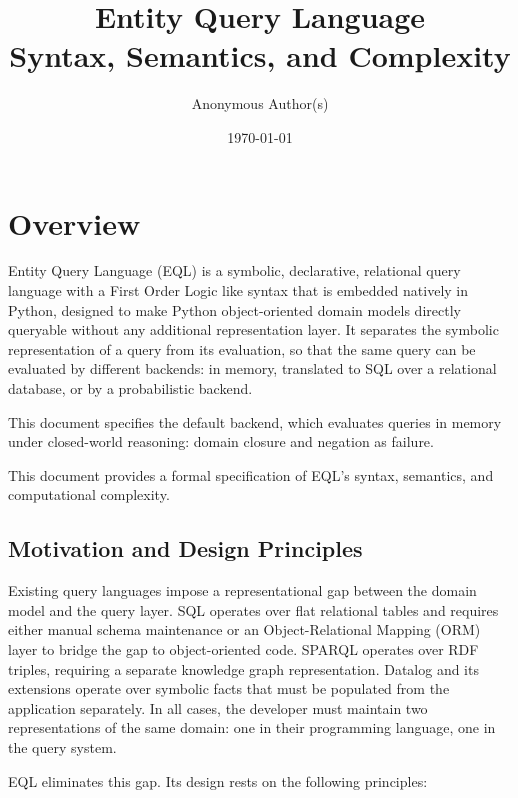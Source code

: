 \documentclass[11pt, a4paper]{article}
\title{\textbf{Entity Query Language}\\[4pt]
       \large Syntax, Semantics, and Complexity}
\author{Anonymous Author(s)}
\date{\today}
\theoremstyle{plain}
\theoremstyle{definition}
\theoremstyle{remark}
\begin{document}

\maketitle
\tableofcontents
\bigskip

\section{Overview}
\label{sec:eql:overview}

Entity Query Language (EQL) is a symbolic, declarative, relational query language  with a First Order Logic like syntax that is embedded natively in
Python, designed to make Python object-oriented domain models directly queryable without any
additional representation layer. It separates the symbolic representation of a query from its evaluation, so that the same query can be evaluated by different backends: in memory, translated to SQL over a relational database, or by a probabilistic backend.

This document specifies the default backend, which evaluates queries in memory under closed-world reasoning: domain closure and negation as failure.

This document provides a formal specification of EQL's
syntax, semantics, and computational complexity.

\subsection{Motivation and Design Principles}

Existing query languages impose a representational gap between the domain model and the query
layer.  SQL operates over flat relational tables and requires either manual schema maintenance
or an Object-Relational Mapping (ORM) layer to bridge the gap to object-oriented code.
SPARQL operates over RDF triples, requiring a separate knowledge graph representation.  Datalog
and its extensions operate over symbolic facts that must be populated from the application
separately.  In all cases, the developer must maintain two representations of the same domain:
one in their programming language, one in the query system.

EQL eliminates this gap.  Its design rests on the following principles:
\end{document}

